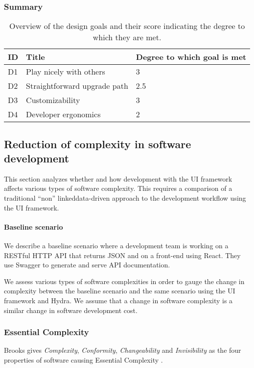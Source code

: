 \subsubsection{Summary}

\begin{table}[!htb]
  \begin{center}
    \begin{tabular}{|l|l|l|}
      \hline
      \textbf{ID} & \textbf{Title} & \textbf{Degree to which goal is met} \\
      \hline
      D1 & Play nicely with others & 3 \\
      \hline
      D2 & Straightforward upgrade path & 2.5 \\
      \hline
      D3 & Customizability & 3 \\
      \hline
      D4 & Developer ergonomics & 2 \\
      \hline
    \end{tabular}
    \caption{Overview of the design goals and their score indicating the degree to which they are met.}
    \label{tab:designgoalscomplexity}
  \end{center}
\end{table}

\subsection{Reduction of complexity in software development}
This section analyzes whether and how development with the UI framework affects various types of software complexity. This requires a comparison of a traditional ``non'' \gls{linkeddata}-driven approach to the development workflow using the UI framework.

\paragraph{Baseline scenario} We describe a baseline scenario where a development team is working on a RESTful HTTP API that returns JSON and on a front-end using React. They use Swagger to generate and serve API documentation.

We assess various types of software complexities in order to gauge the change in complexity between the baseline scenario and the same scenario using the UI framework and Hydra. We assume that a change in software complexity is a similar change in software development cost.

\subsubsection{Essential Complexity}
Brooks gives \textit{Complexity}, \textit{Conformity}, \textit{Changeability} and \textit{Invisibility} as the four properties of software causing Essential Complexity \citep{nosilverbullet}.

